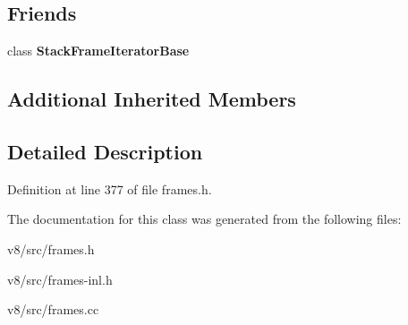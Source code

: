 \subsection*{Friends}
\begin{DoxyCompactItemize}
\item 
\mbox{\label{classv8_1_1internal_1_1ExitFrame_ac7310421866976ca454bbe11c5f926c3}} 
class {\bfseries Stack\+Frame\+Iterator\+Base}
\end{DoxyCompactItemize}
\subsection*{Additional Inherited Members}


\subsection{Detailed Description}


Definition at line 377 of file frames.\+h.



The documentation for this class was generated from the following files\+:\begin{DoxyCompactItemize}
\item 
v8/src/frames.\+h\item 
v8/src/frames-\/inl.\+h\item 
v8/src/frames.\+cc\end{DoxyCompactItemize}
